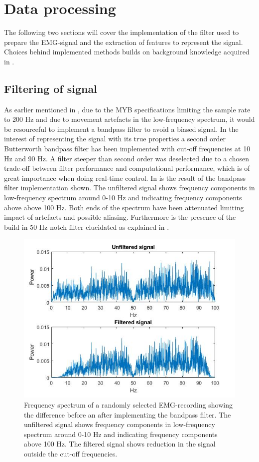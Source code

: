 

\section{Data processing} \label{sec:M:dataProcessing}

The following two sections will cover the implementation of the filter used to prepare the EMG-signal and the extraction of features to represent the signal. Choices behind implemented methods builds on background knowledge acquired in .

\subsection{Filtering of signal} \label{sub:M:filtering} 

As earlier mentioned in , due to the MYB specifications limiting the sample rate to 200 Hz and due to movement artefacts in the low-frequency spectrum, it would be resourceful to implement a bandpass filter to avoid a biased signal.
In the interest of representing the signal with its true properties a second order Butterworth bandpass filter has been implemented with cut-off frequencies at 10 Hz and 90 Hz. A filter steeper than second order was deselected due to a chosen trade-off between filter performance and computational performance, which is of great importance when doing real-time control. In  is the result of the bandpass filter implementation shown. The unfiltered signal shows frequency components in low-frequency spectrum around 0-10 Hz and indicating frequency components above above 100 Hz. Both ends of the spectrum have been attenuated limiting impact of artefacts and possible aliasing. Furthermore is the presence of the build-in 50 Hz notch filter elucidated as explained in .     


\begin{figure}[H]                 
\includegraphics[width=.8\textwidth]{figures/pMethods/Filt}  
\caption{Frequency spectrum of a randomly selected EMG-recording showing the difference before an after implementing the bandpass filter. The unfiltered signal shows frequency components in low-frequency spectrum around 0-10 Hz and indicating frequency components above 100 Hz. The filtered signal shows reduction in the signal outside the cut-off frequencies.}
\label{fig:filt} 
\end{figure}

